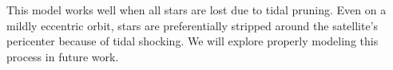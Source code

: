 \documentclass[letterpaper,12pt,preprint]{aastex}
\newcommand{\given}{\,|\,}
\newcommand{\D}{{\bf D}}
\newcommand{\W}{{\bf W}}
\newcommand{\J}{{\boldsymbol J}}
\newcommand{\rtide}{r_{\rm tide}}
\newcommand{\bs}{\boldsymbol}
\newcommand{\sat}{{\rm p}}
\newcommand{\tub}{t_{\rm ub}}
\newcommand{\tailbit}{\beta}
\newcommand{\Loffset}{\alpha}
\newcommand{\pshock}{P_{\rm shock}}
\begin{document}
This model works well when all stars are lost due to tidal pruning. Even on a mildly eccentric orbit, stars are preferentially stripped around the satellite's pericenter because of tidal shocking. We will explore properly modeling this process in future work. 

\end{document}
